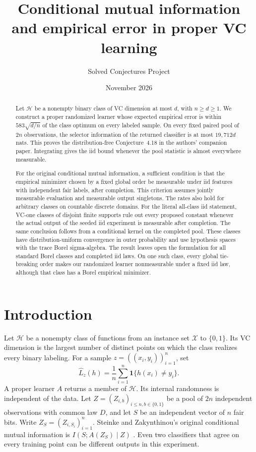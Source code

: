\documentclass[11pt]{article}
\title{Conditional mutual information and empirical error in proper VC learning}
\author{Solved Conjectures Project}
\date{November 2026}
\theoremstyle{definition}\newtheorem{definition}[theorem]{Definition}
\newcommand{\HH}{\mathcal H}
\newcommand{\XX}{\mathcal X}
\newcommand{\ind}{\mathbf 1}
\newcommand{\err}{\widehat L}
\begin{document}
\maketitle
\begin{abstract}
Let $\HH$ be a nonempty binary class of VC dimension at most $d$, with $n\ge d\ge1$.
We construct a proper randomized learner whose expected empirical error is
within $583\sqrt{d/n}$ of the class optimum on every labeled sample. On every
fixed paired pool of $2n$ observations, the selector information of the
returned classifier is at most $19{,}712d$ nats. This proves the
distribution-free Conjecture~4.18 in the authors' companion paper.
Integrating gives the iid bound whenever the pool statistic is almost
everywhere measurable.

For the original conditional mutual information, a sufficient condition is
that the empirical minimizer chosen by a fixed global order be measurable
under iid features with independent fair labels, after completion. This criterion assumes
jointly measurable evaluation and measurable output singletons. The rates also hold for arbitrary classes on countable discrete
domains. For the literal all-class iid statement, VC-one classes of disjoint
finite supports rule out every proposed constant whenever the actual output
of the seeded iid experiment is measurable after completion. The same
conclusion follows from a conditional kernel on the completed pool.
These classes have distribution-uniform convergence in outer probability
and use hypothesis spaces with the trace Borel sigma-algebra. The result
leaves open the formulation for all standard Borel classes and completed iid
laws. On one such class, every global tie-breaking order makes our randomized
learner nonmeasurable under a fixed iid law, although that class has a Borel
empirical minimizer.
\end{abstract}

\section{Introduction}\label{sec:statement}
Let $\HH$ be a nonempty class of functions from an instance set $\XX$ to
$\{0,1\}$. Its VC dimension is the largest number of distinct points on
which the class realizes every binary labeling. For a sample
$z=((x_i,y_i))_{i=1}^n$, set
\[
 \err_z(h)=\frac1n\sum_{i=1}^n\ind\{h(x_i)\ne y_i\}.
\]
A proper learner $A$ returns a member of $\HH$. Its internal randomness
is independent of the data. Let $Z=(Z_{i,b})_{i\le n,b\in\{0,1\}}$ be a pool
of $2n$ independent observations with common law $D$, and let $S$ be an
independent vector of $n$ fair bits. Write $Z_S=(Z_{i,S_i})_{i=1}^n$.
Steinke and Zakynthinou's original conditional mutual information is
$I(S;A(Z_S)\mid Z)$ \cite[Definition 3]{problem}. Even two classifiers that
agree on every training point can be different outputs in this experiment.
\end{document}

